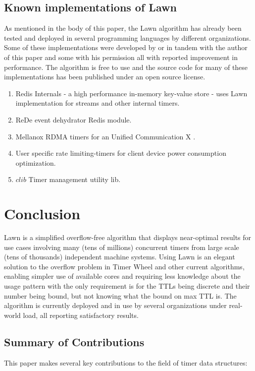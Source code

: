 \documentclass[conference]{IEEEtran}
\begin{document}
\subsection{Known implementations of Lawn}
As mentioned in the body of this paper, the Lawn algorithm has already been tested and deployed in several programming languages by different organizations. Some of these implementations were developed by or in tandem with the author of this paper and some with his permission all with reported improvement in performance. The algorithm is free to use and the source code for many of these implementations has been published under an open source license.
\begin{enumerate}
	\item Redis Internals \cite{Redis} - a high performance in-memory key-value store - uses Lawn implementation for streams and other internal timers.
	\item ReDe event dehydrator Redis module\cite{REDE}.
	\item Mellanox RDMA timers for an Unified Communication X\cite{MLNX} . 
	\item User specific rate limiting-timers for client device power consumption optimization\cite{VUSR}.
	\item $clib$ Timer management utility lib.
\end{enumerate}

\section{Conclusion}
Lawn is a simplified overflow-free algorithm that displays near-optimal results for use cases involving many (tens of millions) concurrent timers from large scale (tens of thousands) independent machine systems.
Using Lawn is an elegant solution to the overflow problem in Timer Wheel and other current algorithms, enabling simpler use of available cores and requiring less knowledge about the usage pattern with the only requirement is for the TTLs being discrete and their number being bound, but not knowing what the bound on max TTL is.
The algorithm is currently deployed and in use by several organizations under real-world load, all reporting satisfactory results.

\subsection{Summary of Contributions}
This paper makes several key contributions to the field of timer data structures:
\end{document}
